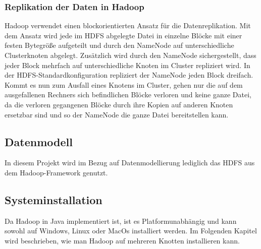 \subsubsection{Replikation der Daten in Hadoop}
Hadoop verwendet einen blockorientierten Ansatz für die Datenreplikation. Mit dem Ansatz wird jede im HDFS abgelegte Datei in einzelne Blöcke mit einer festen Bytegröße aufgeteilt und durch den NameNode auf unterschiedliche Clusterknoten abgelegt. Zusätzlich wird durch den NameNode sichergestellt, dass jeder Block mehrfach auf unterschiedliche Knoten im Cluster repliziert wird.
In der HDFS-Standardkonfiguration repliziert der NameNode jeden Block dreifach. Kommt es nun zum Ausfall eines Knotens im Cluster, gehen nur die auf dem ausgefallenen Rechners sich befindlichen Blöcke verloren und keine ganze Datei, da die verloren gegangenen Blöcke durch ihre Kopien auf anderen Knoten ersetzbar sind und so der NameNode die ganze Datei bereitstellen kann.
\cite{replikation}

\subsection{Datenmodell}
In diesem Projekt wird im Bezug auf Datenmodellierung lediglich das \ac{HDFS} aus dem Hadoop-Framework genutzt. 

\subsection{Systeminstallation} %
Da Hadoop in Java implementiert ist, ist es Platformunabhängig und kann sowohl auf Windows, Linux oder MacOs installiert werden.
Im Folgenden Kapitel wird beschrieben, wie man Hadoop auf mehreren Knotten installieren kann. 

